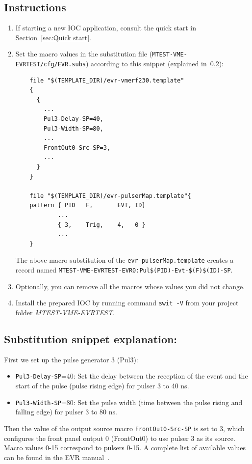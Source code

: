 \documentclass[12pt,a4paper]{article}
\begin{document}
\subsection{Instructions}
\begin{enumerate}
	\item If starting a new IOC application, consult the quick start in Section~\ref{sec:Quick start}.

	\item Set the macro values in the substitution file (\texttt{MTEST-VME-EVRTEST/cfg/EVR.subs}) according to this snippet (explained in~\ref{sec:explain_pulser}):
\begin{verbatim}
	file "$(TEMPLATE_DIR)/evr-vmerf230.template"
	{
	  {
	    ...
	    Pul3-Delay-SP=40,
	    Pul3-Width-SP=80,
	    ...
	    FrontOut0-Src-SP=3,
	    ...
	  }
	}

	file "$(TEMPLATE_DIR)/evr-pulserMap.template"{
	pattern { PID   F,       EVT, ID}
	        ...
	        { 3,    Trig,    4,   0 }
	        ...
	}
\end{verbatim}
	The above macro substitution of the \texttt{evr-pulserMap.template} creates a record named \texttt{MTEST-VME-EVRTEST-EVR0:Pul\$(PID)-Evt-\$(F)\$(ID)-SP}.
	\item Optionally, you can remove all the macros whose values you did not change. 
	\item Install the prepared IOC by running command \texttt{swit -V} from your project folder \textit{MTEST-VME-EVRTEST}.
\end{enumerate}
\subsection{Substitution snippet explanation:}\label{sec:explain_pulser}

First we set up the pulse generator 3 (Pul3):
\begin{itemize}
	\item \texttt{Pul3-Delay-SP}=40: Set the delay between the reception of the event and the start of the pulse (pulse rising edge) for pulser 3 to 40 ns. 
	\item \texttt{Pul3-Width-SP}=80: Set the pulse width (time between the pulse rising and falling edge) for pulser 3 to 80 ns.
\end{itemize}

Then the value of the output source macro \texttt{FrontOut0-Src-SP} is set to 3, which configures the front panel output 0 (FrontOut0) to use pulser 3 as its source. Macro values 0-15 correspond to pulsers 0-15. A complete list of available values can be found in the EVR manual~\cite{evr_manual}.
\end{document}
